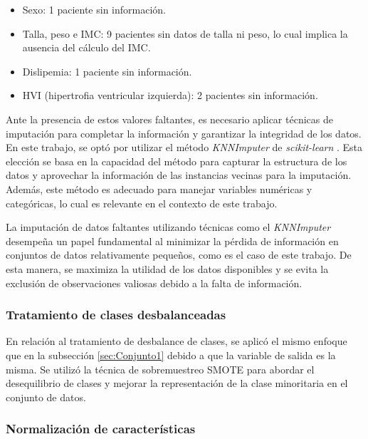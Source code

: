 \begin{itemize}
  \item Sexo: 1 paciente sin información.
  \item Talla, peso e IMC: 9 pacientes sin datos de talla ni peso, lo cual implica la ausencia del cálculo del IMC.
  \item Dislipemia: 1 paciente sin información.
  \item HVI (hipertrofia ventricular izquierda): 2 pacientes sin información.
\end{itemize}

Ante la presencia de estos valores faltantes, es necesario aplicar técnicas de imputación para completar 
la información y garantizar la integridad de los datos. En este trabajo, se optó por utilizar el método 
\emph{KNNImputer} de \emph{scikit-learn} \citep{CITE:50}. Esta elección se basa en la capacidad del método
para capturar la estructura de los datos y aprovechar la información de las instancias vecinas para la 
imputación. Además, este método es adecuado para manejar variables numéricas y categóricas, lo cual es 
relevante en el contexto de este trabajo.

La imputación de datos faltantes utilizando técnicas como el \emph{KNNImputer} desempeña un papel fundamental 
al minimizar la pérdida de información en conjuntos de datos relativamente pequeños, 
como es el caso de este trabajo. De esta manera, se maximiza la utilidad de los datos disponibles y se evita la exclusión 
de observaciones valiosas debido a la falta de información.


\subsubsection{Tratamiento de clases desbalanceadas}

En relación al tratamiento de desbalance de clases, se aplicó el mismo enfoque que en la subsección 
\ref{sec:Conjunto1} debido a que la variable de salida es la misma. Se utilizó la técnica de sobremuestreo 
SMOTE para abordar el desequilibrio de clases y mejorar la representación de la clase minoritaria en el conjunto de datos. 

\subsubsection{Normalización de características}

